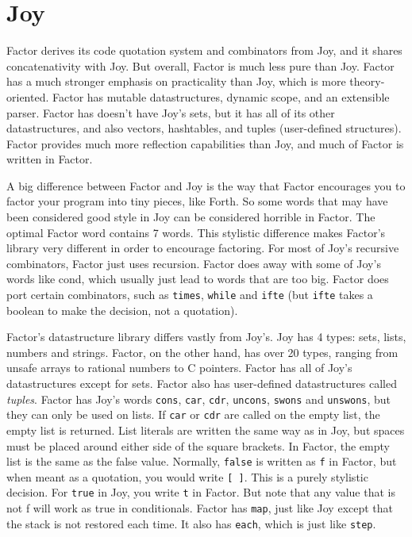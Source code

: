 \documentclass{article}
\begin{document}
\section{Joy}

Factor derives its code quotation system and combinators from Joy, and it shares concatenativity with Joy. But overall, Factor is much less pure than Joy. Factor has a much stronger emphasis on practicality than Joy, which is more theory-oriented. Factor has mutable datastructures, dynamic scope, and an extensible parser. Factor has doesn't have Joy's sets, but it has all of its other datastructures, and also vectors, hashtables, and tuples (user-defined structures). Factor provides much more reflection capabilities than Joy, and much of Factor is written in Factor.

A big difference between Factor and Joy is the way that Factor encourages you to factor your program into tiny pieces, like Forth. So some words that may have been considered good style in Joy can be considered horrible in Factor. The optimal Factor word contains 7 words. This stylistic difference makes Factor's library very different in order to encourage factoring. For most of Joy's recursive combinators, Factor just uses recursion. Factor does away with some of Joy's words like cond, which usually just lead to words that are too big. Factor does port certain combinators, such as \texttt{times}, \texttt{while} and \texttt{ifte} (but \texttt{ifte} takes a boolean to make the decision, not a quotation).

Factor's datastructure library differs vastly from Joy's. Joy has 4 types: sets, lists, numbers and strings. Factor, on the other hand, has over 20 types, ranging from unsafe arrays to rational numbers to C pointers. Factor has all of Joy's datastructures except for sets. Factor also has user-defined datastructures called \emph{tuples}. Factor has Joy's words \texttt{cons}, \texttt{car}, \texttt{cdr}, \texttt{uncons}, \texttt{swons} and \texttt{unswons}, but they can only be used on lists. If \texttt{car} or \texttt{cdr} are called on the empty list, the empty list is returned. List literals are written the same way as in Joy, but spaces must be placed around either side of the square brackets. In Factor, the empty list is the same as the false value. Normally, \texttt{false} is written as \texttt{f} in Factor, but when meant as a quotation, you would write \texttt{[ ]}. This is a purely stylistic decision. For \texttt{true} in Joy, you write \texttt{t} in Factor. But note that any value that is not f will work as true in conditionals. Factor has \texttt{map}, just like Joy except that the stack is not restored each time. It also has \texttt{each}, which is just like \texttt{step}.
\end{document}
